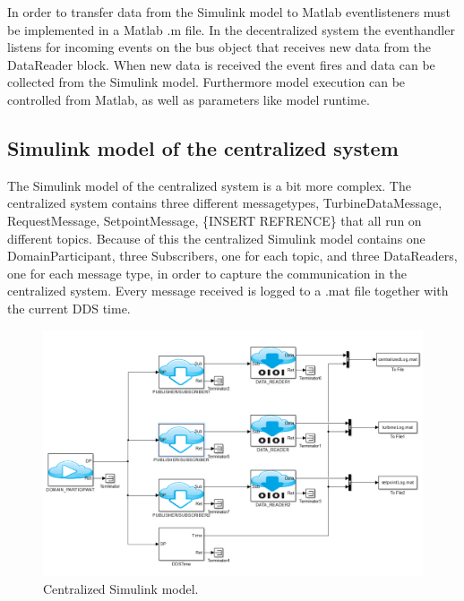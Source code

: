 In order to transfer data from the Simulink model to Matlab eventlisteners must be implemented in a Matlab .m file. In the decentralized system the eventhandler listens for incoming events on the bus object that receives new data from the DataReader block. When new data is received the event fires and data can be collected from the Simulink model. Furthermore model execution can be controlled from Matlab, as well as parameters like model runtime.

\subsection{Simulink model of the centralized system}\label{subsec:centralizedmodel}
The Simulink model of the centralized system is a bit more complex. The centralized system contains three different messagetypes, TurbineDataMessage, RequestMessage, SetpointMessage, \{INSERT REFRENCE\} that all run on different topics. Because of this the centralized Simulink model contains one DomainParticipant, three Subscribers, one for each topic, and three DataReaders, one for each message type, in order to capture the communication in the centralized system. Every message received is logged to a .mat file together with the current DDS time.

\begin{figure}[h]
\includegraphics[width=\textwidth]{figures/CentralizedModel}
	\caption[Centralized Simulink model]{
		\label{fig:centralizedSimulinkModel} 
		\footnotesize{%
			Centralized Simulink model.
		}
	}
\end{figure}